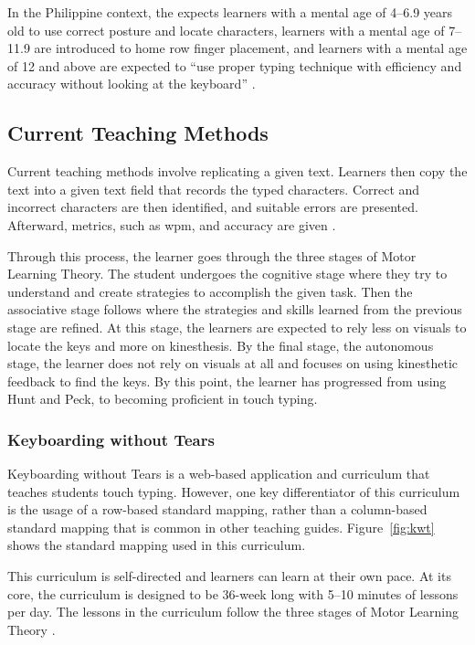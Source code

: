 \documentclass{report}
\begin{document}
In the Philippine context, the \citeauthor{deped} expects learners with a mental
age of 4--6.9 years old to use correct posture and locate characters, learners
with a mental age of 7--11.9 are introduced to home row finger placement, and
learners with a mental age of 12 and above are expected to ``use proper typing
technique with efficiency and accuracy without looking at the keyboard''
\parencite{deped}.

\subsection{Current Teaching Methods}

Current teaching methods involve replicating a given text. Learners then copy
the text into a given text field that records the typed characters. Correct and
incorrect characters are then identified, and suitable errors are presented.
Afterward, metrics, such as \ac{wpm}, and accuracy are given
\parencite{bartnik2021, typeracer}.

Through this process, the learner goes through the three stages of Motor
Learning Theory. The student undergoes the cognitive stage where they try to
understand and create strategies to accomplish the given task. Then the
associative stage follows where the strategies and skills learned from the
previous stage are refined. At this stage, the learners are expected to rely less
on visuals to locate the keys and more on kinesthesis. By the final stage, the
autonomous stage, the learner does not rely on visuals at all and focuses on
using kinesthetic feedback to find the keys. By this point, the learner has
progressed from using Hunt and Peck, to becoming proficient in touch typing.
\parencite{donica2018}

\subsubsection{Keyboarding without Tears}

Keyboarding without Tears is a web-based application and curriculum that teaches
students touch typing. However, one key differentiator of this curriculum is the
usage of a row-based standard mapping, rather than a column-based standard
mapping that is common in other teaching guides. Figure~\ref{fig:kwt} shows the
standard mapping used in this curriculum.

This curriculum is self-directed and learners can learn at their own pace. At
its core, the curriculum is designed to be 36-week long with 5--10 minutes of
lessons per day. The lessons in the curriculum follow the three stages of
Motor Learning Theory \parencite{kwt}.
\end{document}
